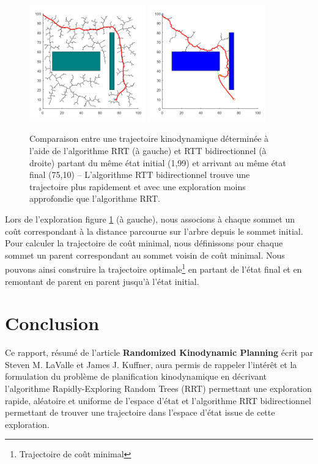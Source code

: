 \documentclass[12pt]{article}
\begin{document}
\begin{figure}[H]
\centering
\includegraphics[width=0.45\textwidth]{../matlab/Traj_RRT.png}
\includegraphics[width=0.45\textwidth]{../matlab/Traj_RRTbi.png}
\caption{Comparaison entre une trajectoire kinodynamique déterminée à l'aide de l'algorithme RRT (à gauche) et RTT bidirectionnel (à droite) partant du même état initial (1,99) et arrivant au même état final (75,10) -- L'algorithme RTT bidirectionnel trouve une trajectoire plus rapidement et avec une exploration moins approfondie que l'algorithme RRT.}
\label{RRTBi}
\end{figure}

Lors de l'exploration figure \ref{RRTBi} (à gauche), nous associons à chaque sommet un coût correspondant à la distance parcourue sur l'arbre depuis le sommet initial. Pour calculer la trajectoire de coût minimal, nous définissons pour chaque sommet un \og parent \fg{} correspondant au sommet voisin de coût minimal. Nous pouvons ainsi construire la trajectoire optimale\footnote{Trajectoire de coût minimal} en partant de l'état final et en remontant de parent en parent jusqu'à l'état initial. 

\section{Conclusion}
Ce rapport, résumé de l'article \textbf{Randomized Kinodynamic Planning} écrit par Steven M. LaValle et James J. Kuffner, aura permis de rappeler l'intérêt et la formulation du problème de planification kinodynamique en décrivant l'algorithme \og Rapidly-Exploring Random Trees \fg{}  (RRT) permettant une exploration rapide, aléatoire et uniforme de l'espace d'état et l'algorithme RRT bidirectionnel permettant de trouver une trajectoire dans l'espace d'état issue de cette exploration.
\end{document}
